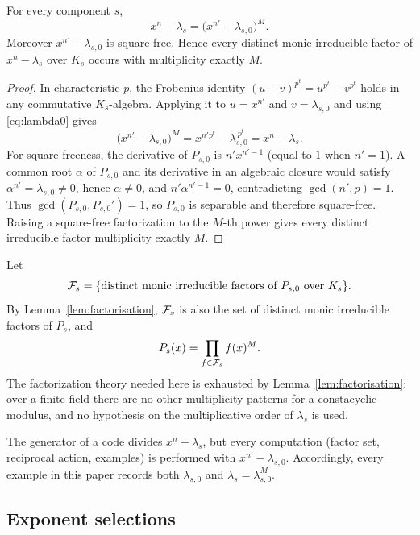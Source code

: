 \begin{lemma}\label{lem:factorisation}
For every component $s$,
\begin{equation}\label{eq:factorisation}
x^n-\lambda_s=\bigl(x^{n'}-\lambda_{s,0}\bigr)^M .
\end{equation}
Moreover $x^{n'}-\lambda_{s,0}$ is square-free.  Hence every distinct monic
irreducible factor of $x^n-\lambda_s$ over $K_s$ occurs with multiplicity
exactly $M$.
\end{lemma}

\begin{proof}
In characteristic $p$, the Frobenius identity
$(u-v)^{p^t}=u^{p^t}-v^{p^t}$ holds in any commutative $K_s$-algebra.  Applying
it to $u=x^{n'}$ and $v=\lambda_{s,0}$ and using \eqref{eq:lambda0} gives
\[
\bigl(x^{n'}-\lambda_{s,0}\bigr)^M
   =x^{n'p^t}-\lambda_{s,0}^{\,p^t}=x^n-\lambda_s .
\]
For square-freeness, the derivative of $P_{s,0}$ is $n'x^{n'-1}$ (equal to $1$
when $n'=1$).  A common root $\alpha$ of $P_{s,0}$ and its derivative in an
algebraic closure would satisfy $\alpha^{n'}=\lambda_{s,0}\neq0$, hence
$\alpha\neq0$, and $n'\alpha^{n'-1}=0$, contradicting $\gcd(n',p)=1$.
Thus $\gcd(P_{s,0},P_{s,0}')=1$, so $P_{s,0}$ is separable and therefore
square-free.  Raising a square-free factorization to the $M$-th power gives
every distinct irreducible factor multiplicity exactly $M$.
\end{proof}

Let
\[
\mathcal F_s=\{\text{distinct monic irreducible factors of }P_{s,0}\text{ over }K_s\}.
\]
By Lemma~\ref{lem:factorisation}, $\mathcal F_s$ is also the set of distinct monic
irreducible factors of $P_s$, and
\[
P_s(x)=\prod_{f\in\mathcal F_s}f(x)^M .
\]
The factorization theory needed here is exhausted by
Lemma~\ref{lem:factorisation}: over a finite field there are no other
multiplicity patterns for a constacyclic modulus, and no hypothesis on the
multiplicative order of $\lambda_s$ is used.

\begin{remark}\label{rem:lambda0}
The generator of a code divides $x^n-\lambda_s$, but every computation (factor
set, reciprocal action, examples) is performed with $x^{n'}-\lambda_{s,0}$.
Accordingly, every example in this paper records both $\lambda_{s,0}$ and
$\lambda_s=\lambda_{s,0}^M$.
\end{remark}

\subsection{Exponent selections}\label{sec:selections}

